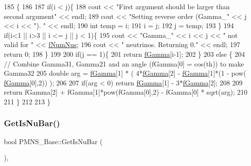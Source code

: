 \begin{DoxyCode}
185 \{
186 
187   \textcolor{keywordflow}{if}(i < j)\{
188     cout << \textcolor{stringliteral}{"First argument should be larger than second argument"} << endl;
189     cout << \textcolor{stringliteral}{"Setting reverse order (Gamma\_"} << j << i << \textcolor{stringliteral}{"). "} << endl;
190     \textcolor{keywordtype}{int} temp = i;
191     i = j;
192     j = temp;
193   \}
194   \textcolor{keywordflow}{if}(i<1 || i>3 || i <= j || j < 1)\{
195     cout << \textcolor{stringliteral}{"Gamma\_"} << i << j << \textcolor{stringliteral}{" not valid for "} << \hyperlink{classOscProb_1_1PMNS__Base_a24bb74bed63569dfe88b18fa6a08060e}{fNumNus};
196     cout << \textcolor{stringliteral}{" neutrinos. Returning 0."} << endl;
197     \textcolor{keywordflow}{return} 0;
198   \}
199 
200   \textcolor{keywordflow}{if}(j == 1)\{ 
201     \textcolor{keywordflow}{return} \hyperlink{classOscProb_1_1PMNS__Deco_ae2f30ac9f8b25344959f1698616d337a}{fGamma}[i-1];
202   \}
203   \textcolor{keywordflow}{else} \{
204     \textcolor{comment}{// Combine Gamma31, Gamma21 and an angle (fGamma[0] = cos(th)) to make Gamma32}
205     \textcolor{keywordtype}{double} arg = \hyperlink{classOscProb_1_1PMNS__Deco_ae2f30ac9f8b25344959f1698616d337a}{fGamma}[1] * ( 4*\hyperlink{classOscProb_1_1PMNS__Deco_ae2f30ac9f8b25344959f1698616d337a}{fGamma}[2] - \hyperlink{classOscProb_1_1PMNS__Deco_ae2f30ac9f8b25344959f1698616d337a}{fGamma}[1]*(1 - pow(
      \hyperlink{classOscProb_1_1PMNS__Deco_ae2f30ac9f8b25344959f1698616d337a}{fGamma}[0],2)) );
206     
207     \textcolor{keywordflow}{if}(arg < 0) \textcolor{keywordflow}{return} \hyperlink{classOscProb_1_1PMNS__Deco_ae2f30ac9f8b25344959f1698616d337a}{fGamma}[1] - 3*\hyperlink{classOscProb_1_1PMNS__Deco_ae2f30ac9f8b25344959f1698616d337a}{fGamma}[2];
208 
209     \textcolor{keywordflow}{return} fGamma[2] + fGamma[1]*pow(fGamma[0],2) - fGamma[0] * sqrt(arg);
210 
211   \}
212 
213 \}
\end{DoxyCode}
\mbox{\label{classOscProb_1_1PMNS__Base_a2f7f2a028dfe7a90fff6b4f757972c2c}} 
\subsubsection{\texorpdfstring{Get\+Is\+Nu\+Bar()}{GetIsNuBar()}}
{\footnotesize\ttfamily bool P\+M\+N\+S\+\_\+\+Base\+::\+Get\+Is\+Nu\+Bar (\begin{DoxyParamCaption}{ }\end{DoxyParamCaption})\hspace{0.3cm}{\ttfamily [virtual]}, {\ttfamily [inherited]}}

